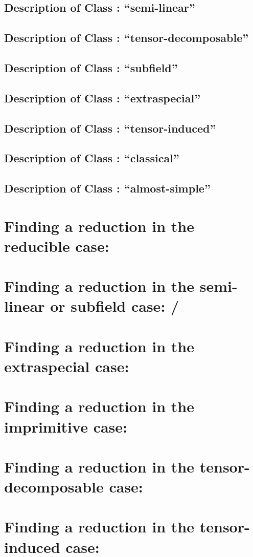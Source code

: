 \subsection{Description of Class : ``semi-linear''}
\label{descC3}

\subsection{Description of Class : ``tensor-decomposable''}
\label{descC4}

\subsection{Description of Class : ``subfield''}
\label{descC5}

\subsection{Description of Class : ``extraspecial''}
\label{descC6}

\subsection{Description of Class : ``tensor-induced''}
\label{descC7}

\subsection{Description of Class : ``classical''}
\label{descC8}

\subsection{Description of Class : ``almost-simple''}
\label{descC9}

\section{Finding a reduction in the reducible case: }
\label{solveC1}

\section{Finding a reduction in the semi-linear or subfield case: /}
\label{solveC3C5}

\section{Finding a reduction in the extraspecial case: }
\label{solveC6}

\section{Finding a reduction in the imprimitive case: }
\label{solveC2}

\section{Finding a reduction in the tensor-decomposable case: }
\label{solveC4}

\section{Finding a reduction in the tensor-induced case: }
\label{solveC7}



